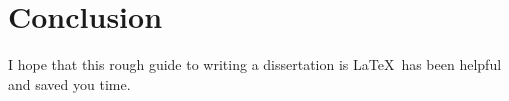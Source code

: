 \documentclass[12pt,a4paper,twoside,openright]{report}
\begin{document}
\chapter{Conclusion}

I hope that this rough guide to writing a dissertation is \LaTeX\ has
been helpful and saved you time.




%
%
%
%
%
%
%
%
%
\end{document}
